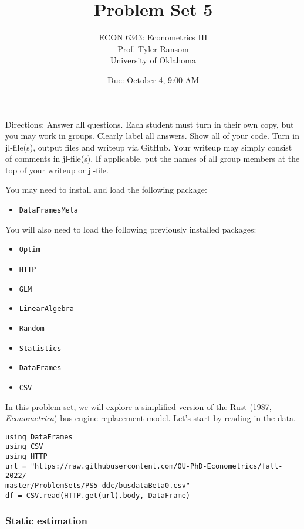 \documentclass[12pt,english]{article}
\begin{document}
\title{Problem Set 5}
\author{ECON 6343: Econometrics III\\
Prof. Tyler Ransom\\
University of Oklahoma}
\date{Due: October 4, 9:00 AM}

\maketitle
Directions: Answer all questions. Each student must turn in their own copy, but you may work in groups. Clearly label all answers. Show all of your code. Turn in jl-file(s), output files and writeup via GitHub. Your writeup may simply consist of comments in jl-file(s). If applicable, put the names of all group members at the top of your writeup or jl-file.

You may need to install and load the following package:
\begin{itemize}
    \item[~] \texttt{DataFramesMeta}
\end{itemize}

You will also need to load the following previously installed packages:
\begin{itemize}
    \item[~] \texttt{Optim} 
    \item[~] \texttt{HTTP} 
    \item[~] \texttt{GLM} 
    \item[~] \texttt{LinearAlgebra} 
    \item[~] \texttt{Random} 
    \item[~] \texttt{Statistics} 
    \item[~] \texttt{DataFrames} 
    \item[~] \texttt{CSV} 
\end{itemize}
\pagebreak
In this problem set, we will explore a simplified version of the Rust (1987, \textit{Econometrica}) bus engine replacement model. Let's start by reading in the data.

\begin{verbatim}
using DataFrames
using CSV
using HTTP
url = "https://raw.githubusercontent.com/OU-PhD-Econometrics/fall-2022/
master/ProblemSets/PS5-ddc/busdataBeta0.csv"
df = CSV.read(HTTP.get(url).body, DataFrame)
\end{verbatim}


\subsubsection*{Static estimation}
\end{document}
